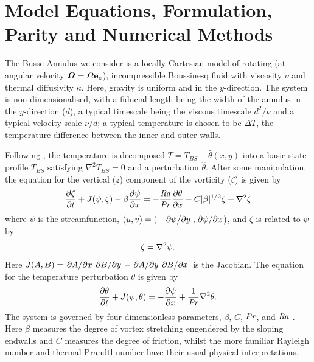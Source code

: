\documentclass{jfm}
\newcommand{\Rayleigh}{\mbox{\textit{Ra}}}  %
\begin{document}
\section{Model Equations, Formulation, Parity and Numerical Methods}
\label{sec:model-eqations}


The Busse Annulus we consider  is a locally Cartesian model of rotating (at angular velocity ${\boldsymbol \Omega = \Omega {\bf e}_z}$), incompressible Boussinesq fluid with viscosity $\nu$ and thermal diffusivity $\kappa$. Here, gravity is uniform and in the $y$-direction. 
The system is non-dimensionalised, with a fiducial length being the width of the annulus in the $y$-direction ($d$), a typical timescale being the viscous timescale $d^2/\nu$ and a typical velocity scale $\nu/d$; a typical temperature is chosen to be $\Delta T$, the temperature difference between the inner and outer walls. 

Following \citet{bh1993, rj2006}, 
the temperature is decomposed $T = T_{BS} +{\hat \theta(x,y)}$ into a basic state profile $T_{BS}$ satisfying $\nabla^2 T_{BS} = 0$ and a perturbation ${\hat \theta}$. 
After some manipulation, the equation for the vertical ($z$) component of the vorticity ($\zeta$) is given by
\begin{equation}
  \label{eq:zeta_eom}
  \pdv{\zeta}{t} + J(\psi, \zeta) - \beta \pdv{\psi}{x} = -\frac{\Rayleigh}{\Pran} \pdv{\theta}{x} -C |\beta|^{1/2} \zeta + \laplacian{\zeta}
\end{equation}
where $\psi$ is the streamfunction, $(u,v) = (-\pdv*{\psi}{y}, \pdv*{\psi}{x})$, and $\zeta$ is related to $\psi$ by
\begin{equation}
  \label{eq:zeta_def}
  \zeta = \laplacian{\psi}.
\end{equation}
Here $J(A, B) = \pdv*{A}{x}\pdv*{B}{y} - \pdv*{A}{y}\pdv*{B}{x}$ is the Jacobian. 
The equation for the temperature perturbation  $\theta$ is given by
%
\begin{equation}
  \label{eq:theta}
  \pdv{\theta}{t} + J(\psi, \theta) = -\pdv{\psi}{x} + \frac{1}{\Pran} \nabla^2 \theta.
\end{equation}
The system is governed by four dimensionless parameters, $\beta$, $C$, $\Pran$, and $\Rayleigh$ \citep[see e.g.][for the definition of these parameters]{tom_2018}. Here $\beta$ measures the degree of vortex stretching engendered by the sloping endwalls and $C$ measures the degree of friction, whilst the more familiar Rayleigh number and thermal Prandtl number have their usual physical interpretations.
\end{document}
